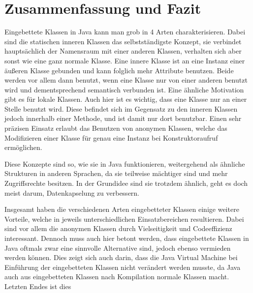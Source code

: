 \chapter{Zusammenfassung und Fazit}

Eingebettete Klassen in Java kann man grob in 4 Arten charakterisieren.
Dabei sind die statischen inneren Klassen das selbstständigste Konzept, sie verbindet hauptsächlich der Namensraum mit einer anderen Klassen, verhalten sich aber sonst wie eine ganz normale Klasse.
Eine innere Klasse ist an eine Instanz einer äußeren Klasse gebunden und kann folglich mehr Attribute benutzen.
Beide werden vor allem dann benutzt, wenn eine Klasse nur von einer anderen benutzt wird und dementsprechend semantisch verbunden ist.
Eine ähnliche Motivation gibt es für lokale Klassen. Auch hier ist es wichtig, dass eine Klasse nur an einer Stelle benutzt wird.
Diese befindet sich im Gegensatz zu den inneren Klassen jedoch innerhalb einer Methode, und ist damit nur dort benutzbar.
Einen sehr präzisen Einsatz erlaubt das Benutzen von anonymen Klassen, welche das Modifizieren einer Klasse für genau eine Instanz bei Konstruktoraufruf ermöglichen.

Diese Konzepte sind so, wie sie in Java funktionieren, weitergehend als ähnliche Strukturen in anderen Sprachen, da sie teilweise mächtiger sind und mehr Zugriffsrechte besitzen.
In der Grundidee sind sie trotzdem ähnlich, geht es doch meist darum, Datenkapselung zu verbessern.

Insgesamt haben die verschiedenen Arten eingebetteter Klassen einige weitere Vorteile, welche in jeweils unterschiedlichen Einsatzbereichen resultieren.
Dabei sind vor allem die anonymen Klassen durch Vielseitigkeit und Codeeffizienz interessant.
Dennoch muss auch hier betont werden, dass eingebettete Klassen in Java oftmals zwar eine sinnvolle Alternative sind, jedoch ebenso vermieden werden können.
Dies zeigt sich auch darin, dass die Java Virtual Machine bei Einführung der eingebetteten Klassen nicht verändert werden musste, da Java auch aus eingebetteten Klassen nach Kompilation normale Klassen macht.
Letzten Endes ist dies

\newpage
